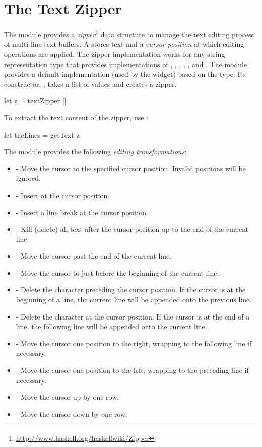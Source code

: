 \section{The Text Zipper}

The  module provides a
\textit{zipper}\footnote{\url{http://www.haskell.org/haskellwiki/Zipper}}
data structure to manage the text editing process of multi-line text
buffers.  A  stores text and a \textit{cursor position}
at which editing operations are applied.  The zipper implementation
works for any string representation type that provides implementations
of , , , , , and
.  The module provides a default implementation (used by the
 widget) based on the  type.  Its
constructor, , takes a list of  values and
creates a zipper.

\begin{haskellcode}
 let z = textZipper []
\end{haskellcode}

To extract the text content of the zipper, use :

\begin{haskellcode}
 let theLines = getText z
\end{haskellcode}

The module provides the following \textit{editing transformations}:

\begin{itemize}
\item {} - Move the cursor to the specified
  cursor position.  Invalid positions will be ignored.
\item {} - Insert  at the cursor position.
\item {} - Insert a line break at the cursor position.
\item {} - Kill (delete) all text after the cursor
  position up to the end of the current line.
\item {} - Move the cursor past the end of the current line.
\item {} - Move the cursor to just before the beginning of
  the current line.
\item {} - Delete the character preceding the cursor
  position.  If the cursor is at the beginning of a line, the current
  line will be appended onto the previous line.
\item {} - Delete the character at the cursor position.
  If the cursor is at the end of a line, the following line will be
  appended onto the current line.
\item {} - Move the cursor one position to the right,
  wrapping to the following line if necessary.
\item {} - Move the cursor one position to the left,
  wrapping to the preceding line if necessary.
\item {} - Move the cursor up by one row.
\item {} - Move the cursor down by one row.
\end{itemize}

